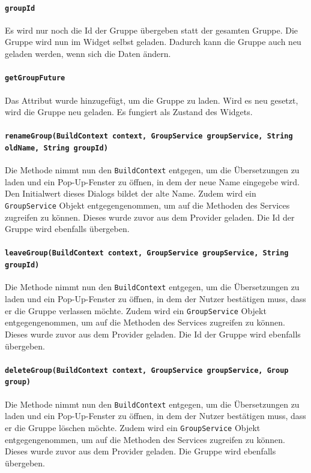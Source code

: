\documentclass{implementierungsheft}
\begin{document}
\paragraph{\texttt{groupId}}
Es wird nur noch die Id der Gruppe übergeben statt der gesamten Gruppe. Die Gruppe wird nun im Widget selbst geladen. Dadurch kann die Gruppe auch neu geladen werden, wenn sich die Daten ändern.
\paragraph{\texttt{getGroupFuture}}
Das Attribut wurde hinzugefügt, um die Gruppe zu laden. Wird es neu gesetzt, wird die Gruppe neu geladen. Es fungiert als Zustand des Widgets.
\paragraph{\texttt{renameGroup(BuildContext context, GroupService groupService, String oldName, String groupId)}}
Die Methode nimmt nun den \texttt{BuildContext} entgegen, um die Übersetzungen zu laden und ein Pop-Up-Fenster zu öffnen, in dem der neue Name eingegebe wird. Den Initialwert dieses Dialogs bildet der alte Name. Zudem wird ein \texttt{GroupService} Objekt entgegengenommen, um auf die Methoden des Services zugreifen zu können. Dieses wurde zuvor aus dem Provider geladen. Die Id der Gruppe wird ebenfalls übergeben.
\paragraph{\texttt{leaveGroup(BuildContext context, GroupService groupService, String groupId)}}
Die Methode nimmt nun den \texttt{BuildContext} entgegen, um die Übersetzungen zu laden und ein Pop-Up-Fenster zu öffnen, in dem der Nutzer bestätigen muss, dass er die Gruppe verlassen möchte. Zudem wird ein \texttt{GroupService} Objekt entgegengenommen, um auf die Methoden des Services zugreifen zu können. Dieses wurde zuvor aus dem Provider geladen. Die Id der Gruppe wird ebenfalls übergeben.
\paragraph{\texttt{deleteGroup(BuildContext context, GroupService groupService, Group group)}}
Die Methode nimmt nun den \texttt{BuildContext} entgegen, um die Übersetzungen zu laden und ein Pop-Up-Fenster zu öffnen, in dem der Nutzer bestätigen muss, dass er die Gruppe löschen möchte. Zudem wird ein \texttt{GroupService} Objekt entgegengenommen, um auf die Methoden des Services zugreifen zu können. Dieses wurde zuvor aus dem Provider geladen. Die Gruppe wird ebenfalls übergeben.
\end{document}
